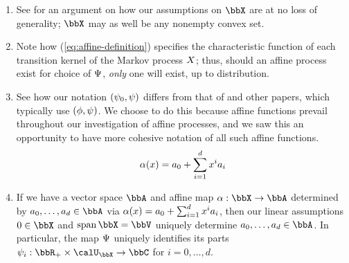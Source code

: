 \begin{remark}
  \label{remark:affine-remarks}
  \begin{enumerate}[label=(\alph*)]
    \item
      See \cite[Remark 2.3]{keller2015} for an argument on how our assumptions on $\stateSpace$ are at no loss of generality; $\stateSpace$ may as well be any nonempty convex set.
    \item
      Note how (\ref{eq:affine-definition}) specifies the characteristic function of each transition kernel of the Markov process $X$; thus, should an affine process exist for choice of $\Psi$, \emph{only} one will exist, up to distribution.
    \item
      See how our notation $(\psi_0, \psi)$ differs from that of \cite{keller2015} and other papers, which typically use $(\phi, \psi)$.
      We choose to do this because affine functions prevail throughout our investigation of affine processes, and we saw this an opportunity to have more cohesive notation of all such affine functions.
      \begin{equation*}
        \alpha(x) = a_0 + \sum_{i=1}^d x^i a_i
      \end{equation*}
    \item
      \label{remark:affine-parts}
      If we have a vector space $\bbA$ and affine map $\alpha: \stateSpace \rightarrow \bbA$ determined by $a_0, \ldots, a_d \in \bbA$ via $\alpha(x) = a_0 + \sum_{i=1}^d x^i a_i$, then our linear assumptions $0 \in \stateSpace$ and $\operatorname{span}\stateSpace = \vecSpace$ uniquely determine $a_0, \ldots, a_d \in \bbA$.
      In particular, the map $\Psi$ uniquely identifies its parts $\affPart_i: \bbR_+ \times \boundedSpace \rightarrow \bbC$ for $i=0,\ldots,d$.
  \end{enumerate}
\end{remark}
